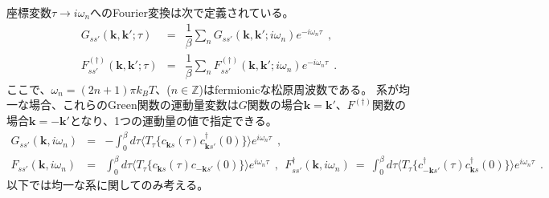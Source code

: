 \documentclass[a4j]{jsarticle}
\begin{document}
座標変数$\tau \to i \omega_{n}$へのFourier変換は次で定義されている。
%
%
%
%
\begin{eqnarray}
	G_{ss'}(\bm{k} , \bm{k}' ; \tau)
	&=&
	\dfrac{1}{\beta} \sum_{n}
	G_{ss'}(\bm{k} , \bm{k}' ; i \omega_{n} )
	e^{- i \omega_{n} \tau }
	\ \ , \nonumber \\[2mm]
	F_{ss'}^{(\dagger)}(\bm{k} , \bm{k}' ; \tau)
	&=&
	\dfrac{1}{\beta} \sum_{n}
	F_{ss'}^{(\dagger)}(\bm{k} , \bm{k}' ; i \omega_{n} )
	e^{- i \omega_{n} \tau }
	\ \ .
\end{eqnarray}
%
%
%
%
ここで、$\omega_{n}=(2n+1)\pi k_{B} T$、($n \in \mathbb{Z}$)はfermionicな松原周波数である。
系が均一な場合、これらのGreen関数の運動量変数は$G$関数の場合$\bm{k}=\bm{k}'$、$F^{(\dagger)}$関数の場合$\bm{k}=-\bm{k}'$となり、1つの運動量の値で指定できる。
%
%
%
%
\begin{eqnarray}
	G_{ss'}(\bm{k} , i \omega_{n} )
	&=&
	-
	\int_{0}^{\beta}
	d \tau
	\langle T_{\tau} \{ c_{\bm{k}s}(\tau) c_{\bm{k} s'}^{\dagger}(0) \} \rangle
	e^{i \omega_{n} \tau}
	\ \ ,
	\\[3mm]
	F_{ss'}(\bm{k} , i \omega_{n} )
	&=&
	\int_{0}^{\beta}
	d \tau
	\langle T_{\tau} \{ c_{ \bm{k} s }(\tau) c_{-\bm{k} s' }(0) \} \rangle
	e^{i \omega_{n} \tau}
	\ \ , \ \
	F_{ss'}^{\dagger}(\bm{k} , i \omega_{n} )
	\ = \
	\int_{0}^{\beta}
	d \tau
	\langle T_{\tau} \{ c_{ - \bm{k} s' }^{\dagger}(\tau) c_{ \bm{k} s }^{\dagger}(0) \} \rangle
	e^{i \omega_{n} \tau}
	\ \ .
\end{eqnarray}
%
%
%
%
以下では均一な系に関してのみ考える。
\end{document}
